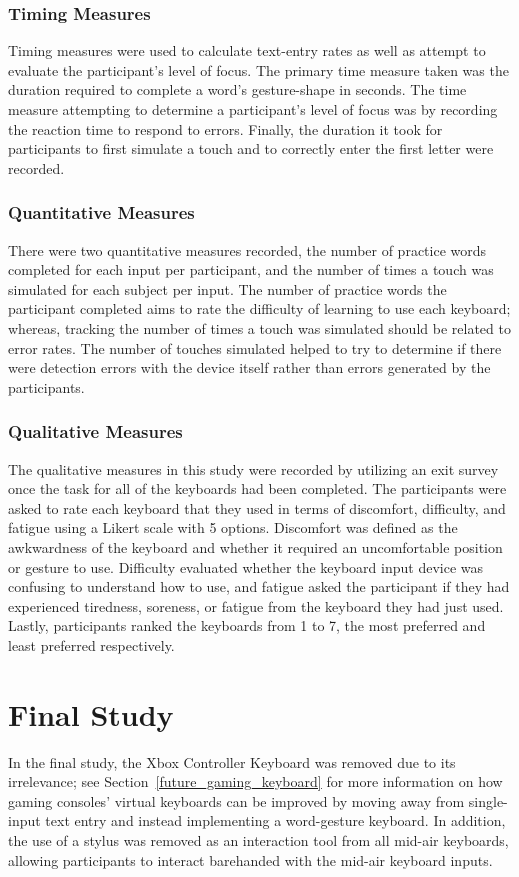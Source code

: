 \subsubsection{Timing Measures}
Timing measures were used to calculate text-entry rates as well as attempt to evaluate the participant's level of focus. The primary time measure taken was the duration required to complete a word's gesture-shape in seconds. The time measure attempting to determine a participant's level of focus was by recording the reaction time to respond to errors. Finally, the duration it took for participants to first simulate a touch and to correctly enter the first letter were recorded.

\subsubsection{Quantitative Measures}
There were two quantitative measures recorded, the number of practice words completed for each input per participant, and the number of times a touch was simulated for each subject per input. The number of practice words the participant completed aims to rate the difficulty of learning to use each keyboard; whereas, tracking the number of times a touch was simulated should be related to error rates. The number of touches simulated helped to try to determine if there were detection errors with the device itself rather than errors generated by the participants.

\subsubsection{Qualitative Measures}
The qualitative measures in this study were recorded by utilizing an exit survey once the task for all of the keyboards had been completed. The participants were asked to rate each keyboard that they used in terms of discomfort, difficulty, and fatigue using a Likert scale with 5 options. Discomfort was defined as the awkwardness of the keyboard and whether it required an uncomfortable position or gesture to use. Difficulty evaluated whether the keyboard input device was confusing to understand how to use, and fatigue asked the participant if they had experienced tiredness, soreness, or fatigue from the keyboard they had just used. Lastly, participants ranked the keyboards from 1 to 7, the most preferred and least preferred respectively. 

\section{Final Study} \label{final_study}
In the final study, the Xbox Controller Keyboard was removed due to its irrelevance; see Section~\ref{future_gaming_keyboard} for more information on how gaming consoles' virtual keyboards can be improved by moving away from single-input text entry and instead implementing a word-gesture keyboard. In addition, the use of a stylus was removed as an interaction tool from all mid-air keyboards, allowing participants to interact barehanded with the mid-air keyboard inputs.

